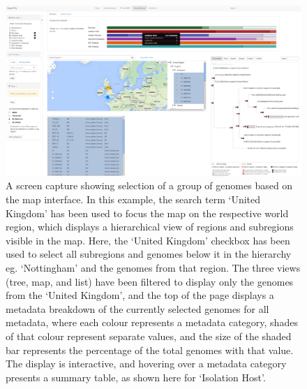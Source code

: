 \documentclass[doublespacing, linenumbers]{bmcart}
\begin{document}
\begin{backmatter}
\newpage
\begin{landscape}
\begin{figure}[h!]
  \includegraphics[width=0.95\columnwidth]{images/uk-map.png}
  \caption{A screen capture showing selection of a group of genomes based on the map interface. In this example, the search term `United Kingdom' has been used to focus the map on the respective world region, which displays a hierarchical view of regions and subregions visible in the map. Here, the `United Kingdom' checkbox has been used to select all subregions and genomes below it in the hierarchy eg. `Nottingham' and the genomes from that region. The three views (tree, map, and list) have been filtered to display only the genomes from the `United Kingdom', and the top of the page displays a metadata breakdown of the currently selected genomes for all metadata, where each colour represents a metadata category, shades of that colour represent separate values, and the size of the shaded bar represents the percentage of the total genomes with that value. The display is interactive, and hovering over a metadata category presents a summary table, as shown here for `Isolation Host'. }
  \label{fig:map_search}
\end{figure}
\end{landscape}


\end{backmatter}
\end{document}
